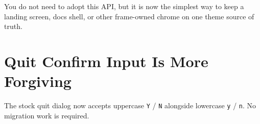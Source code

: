 You do not need to adopt this API, but it is now the simplest way to keep a landing screen, docs shell, or other frame-owned chrome on one theme source of truth.

\section{Quit Confirm Input Is More Forgiving}\label{record-268-quit-confirm-input-is-more-forgiving}

The stock quit dialog now accepts uppercase \texttt{Y} / \texttt{N} alongside lowercase \texttt{y} / \texttt{n}. No migration work is required.

